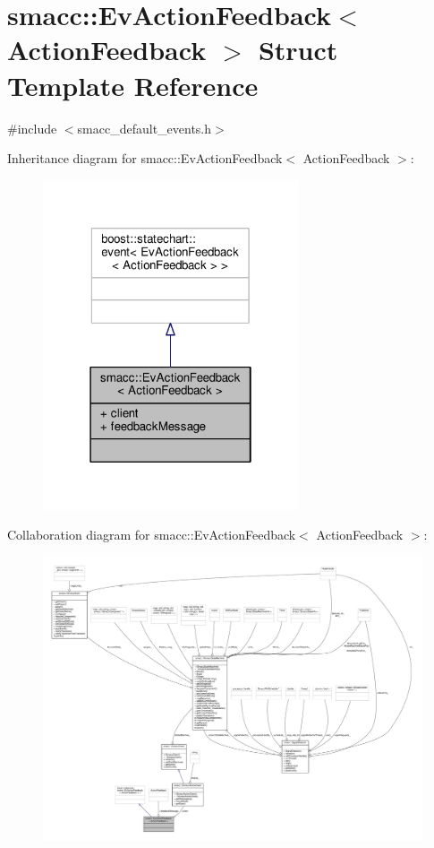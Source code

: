 \hypertarget{structsmacc_1_1EvActionFeedback}{}\section{smacc\+:\+:Ev\+Action\+Feedback$<$ Action\+Feedback $>$ Struct Template Reference}
\label{structsmacc_1_1EvActionFeedback}


{\ttfamily \#include $<$smacc\+\_\+default\+\_\+events.\+h$>$}



Inheritance diagram for smacc\+:\+:Ev\+Action\+Feedback$<$ Action\+Feedback $>$\+:
\nopagebreak
\begin{figure}[H]
\begin{center}
\leavevmode
\includegraphics[width=214pt]{structsmacc_1_1EvActionFeedback__inherit__graph}
\end{center}
\end{figure}


Collaboration diagram for smacc\+:\+:Ev\+Action\+Feedback$<$ Action\+Feedback $>$\+:
\nopagebreak
\begin{figure}[H]
\begin{center}
\leavevmode
\includegraphics[width=350pt]{structsmacc_1_1EvActionFeedback__coll__graph}
\end{center}
\end{figure}
